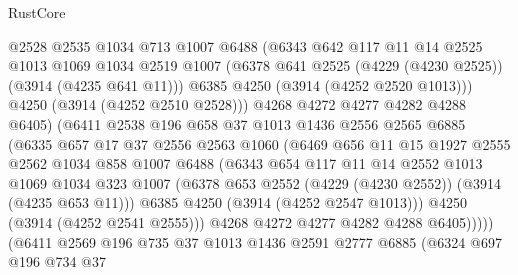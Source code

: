 \begin{lexlean}{RustCore}
\begin{coremodule}
                    @2528
                    @2535
                    @1034
                    @713
                    @1007
                    @6488
                    (@6343
                      @642
                      @117
                      @11
                      @14
                      @2525
                      @1013
                      @1069
                      @1034
                      @2519
                      @1007
                      (@6378 @641 @2525 (@4229 (@4230 @2525)) (@3914 (@4235 @641 @11)))
                      @6385
                      @4250
                      (@3914 (@4252 @2520 @1013)))
                    @4250
                    (@3914 (@4252 @2510 @2528)))
                  @4268
                  @4272
                  @4277
                  @4282
                  @4288
                  @6405)
                (@6411
                  @2538
                  @196
                  @658
                  @37
                  @1013
                  @1436
                  @2556
                  @2565
                  @6885
                  (@6335
                    @657
                    @17
                    @37
                    @2556
                    @2563
                    @1060
                    (@6469
                      @656
                      @11
                      @15
                      @1927
                      @2555
                      @2562
                      @1034
                      @858
                      @1007
                      @6488
                      (@6343
                        @654
                        @117
                        @11
                        @14
                        @2552
                        @1013
                        @1069
                        @1034
                        @323
                        @1007
                        (@6378 @653 @2552 (@4229 (@4230 @2552)) (@3914 (@4235 @653 @11)))
                        @6385
                        @4250
                        (@3914 (@4252 @2547 @1013)))
                      @4250
                      (@3914 (@4252 @2541 @2555)))
                    @4268
                    @4272
                    @4277
                    @4282
                    @4288
                    @6405)))))
          (@6411
            @2569
            @196
            @735
            @37
            @1013
            @1436
            @2591
            @2777
            @6885
            (@6324
              @697
              @196
              @734
              @37

\end{coremodule}
\end{lexlean}
